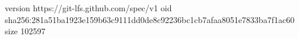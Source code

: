version https://git-lfs.github.com/spec/v1
oid sha256:281a51ba1923e159b63c9111dd0de8c92236bc1cb7afaa8051e7833ba7f1ac60
size 102597
